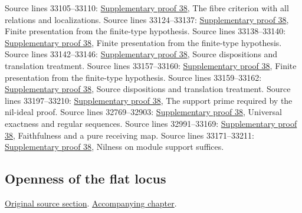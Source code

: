 \begin{AlgebraSourceRoutes}
 Source lines 33105--33110: \hyperlink{algebra_more_flatness_notes_20260928}{Supplementary proof 38}, The fibre criterion with all relations and localizations.
 Source lines 33124--33137: \hyperlink{algebra_more_flatness_notes_20260928}{Supplementary proof 38}, Finite presentation from the finite-type hypothesis.
 Source lines 33138--33140: \hyperlink{algebra_more_flatness_notes_20260928}{Supplementary proof 38}, Finite presentation from the finite-type hypothesis.
 Source lines 33142--33146: \hyperlink{algebra_more_flatness_notes_20260928}{Supplementary proof 38}, Source dispositions and translation treatment.
 Source lines 33157--33160: \hyperlink{algebra_more_flatness_notes_20260928}{Supplementary proof 38}, Finite presentation from the finite-type hypothesis.
 Source lines 33159--33162: \hyperlink{algebra_more_flatness_notes_20260928}{Supplementary proof 38}, Source dispositions and translation treatment.
 Source lines 33197--33210: \hyperlink{algebra_more_flatness_notes_20260928}{Supplementary proof 38}, The support prime required by the nil-ideal proof.
 Source lines 32769--32903: \hyperlink{algebra_more_flatness_notes_20260928}{Supplementary proof 38}, Universal exactness and regular sequences.
 Source lines 32991--33169: \hyperlink{algebra_more_flatness_notes_20260928}{Supplementary proof 38}, Faithfulness and a pure receiving map.
 Source lines 33171--33211: \hyperlink{algebra_more_flatness_notes_20260928}{Supplementary proof 38}, Nilness on module support suffices.
\end{AlgebraSourceRoutes}

\subsection{Openness of the flat locus}
\hypertarget{algebra-source-section-open-flat}{}
\noindent\href{https://github.com/stacks/stacks-project/blob/a04446e57ec1fbc252a871afcec7752fb2807b14/algebra.tex\#L33227}{Original source section}. \href{algebra.pdf\#nameddest=section-open-flat}{Accompanying chapter}.


